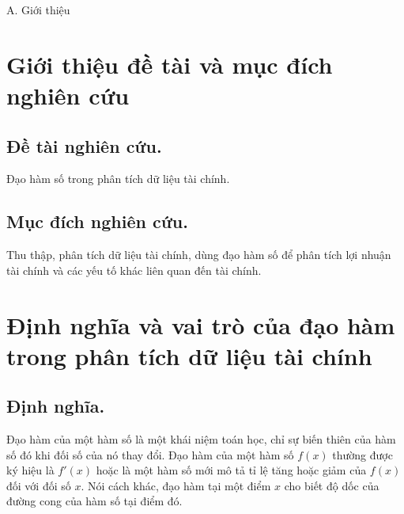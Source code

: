 \documentclass[12pt,a4paper]{report}
\begin{document}
\newpage    
\onehalfspacing
\tableofcontents
\newpage
\begin{center}
    \LARGE A. Giới thiệu
\end{center}
\section{Giới thiệu đề tài và mục đích nghiên cứu}
\subsection{Đề tài nghiên cứu.}
Đạo hàm số trong phân tích dữ liệu tài chính.
\subsection{Mục đích nghiên cứu.}
Thu thập, phân tích dữ liệu tài chính, dùng đạo hàm số để phân tích lợi nhuận tài chính và các yếu tố khác liên quan đến tài chính.
\section{Định nghĩa và vai trò của đạo hàm trong phân tích dữ liệu tài chính}
\subsection{Định nghĩa.}
Đạo hàm của một hàm số là một khái niệm toán học, chỉ sự biến thiên của hàm số đó khi đối số của nó thay đổi. Đạo hàm của một hàm số $f(x)$ thường được ký hiệu là $f'(x)$ hoặc là một hàm số mới mô tả tỉ lệ tăng hoặc giảm của $f(x)$ đối với đối số $x$. Nói cách khác, đạo hàm tại một điểm $x$ cho biết độ dốc của đường cong của hàm số tại điểm đó.
\end{document}
